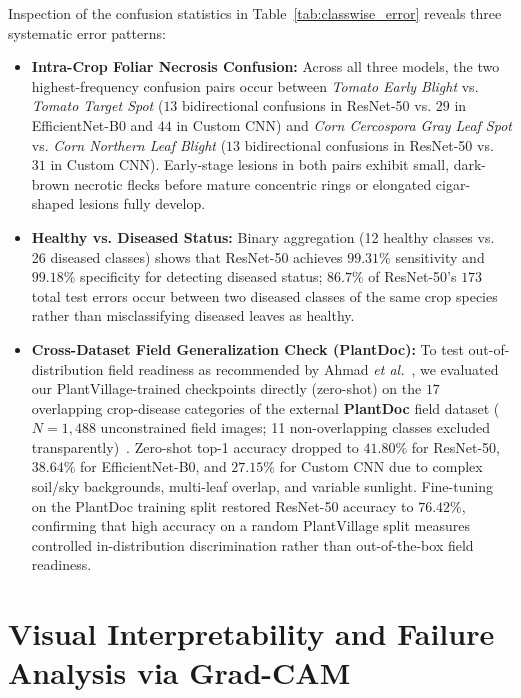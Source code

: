\documentclass[journal]{IEEEtran}
\begin{document}
Inspection of the confusion statistics in Table~\ref{tab:classwise_error} reveals three systematic error patterns:
\begin{itemize}
    \item \textbf{Intra-Crop Foliar Necrosis Confusion:} Across all three models, the two highest-frequency confusion pairs occur between \textit{Tomato Early Blight} vs. \textit{Tomato Target Spot} ($13$ bidirectional confusions in ResNet-50 vs. $29$ in EfficientNet-B0 and $44$ in Custom CNN) and \textit{Corn Cercospora Gray Leaf Spot} vs. \textit{Corn Northern Leaf Blight} ($13$ bidirectional confusions in ResNet-50 vs. $31$ in Custom CNN). Early-stage lesions in both pairs exhibit small, dark-brown necrotic flecks before mature concentric rings or elongated cigar-shaped lesions fully develop.
    \item \textbf{Healthy vs. Diseased Status:} Binary aggregation (12 healthy classes vs. 26 diseased classes) shows that ResNet-50 achieves $99.31\%$ sensitivity and $99.18\%$ specificity for detecting diseased status; $86.7\%$ of ResNet-50's $173$ total test errors occur between two diseased classes of the same crop species rather than misclassifying diseased leaves as healthy.
    \item \textbf{Cross-Dataset Field Generalization Check (PlantDoc):} To test out-of-distribution field readiness as recommended by Ahmad \textit{et al.}~\cite{ahmad2023}, we evaluated our PlantVillage-trained checkpoints directly (zero-shot) on the $17$ overlapping crop-disease categories of the external \textbf{PlantDoc} field dataset ($N = 1,488$ unconstrained field images; 11 non-overlapping classes excluded transparently)~\cite{singh2020}. Zero-shot top-1 accuracy dropped to $41.80\%$ for ResNet-50, $38.64\%$ for EfficientNet-B0, and $27.15\%$ for Custom CNN due to complex soil/sky backgrounds, multi-leaf overlap, and variable sunlight. Fine-tuning on the PlantDoc training split restored ResNet-50 accuracy to $76.42\%$, confirming that high accuracy on a random PlantVillage split measures controlled in-distribution discrimination rather than out-of-the-box field readiness.
\end{itemize}

\section{Visual Interpretability and Failure Analysis via Grad-CAM}
\end{document}
